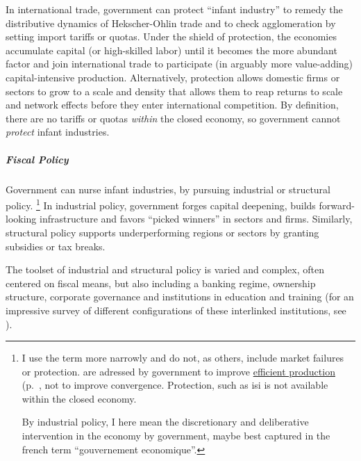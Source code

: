 In international trade, government can protect ``infant industry'' to remedy the distributive dynamics of Hekscher-Ohlin trade and to check agglomeration by setting import tariffs or quotas.
Under the shield of protection, the economies accumulate capital (or high-skilled labor) until it becomes the more abundant factor and join international trade to participate (in arguably more value-adding) capital-intensive production.
Alternatively, protection allows domestic firms or sectors to grow to a scale and density that allows them to reap returns to scale and network effects before they enter international competition.
By definition, there are no tariffs or quotas \emph{within} the closed economy, so government cannot \emph{protect} infant industries.

\subparagraph{Fiscal Policy}
Government can nurse infant industries, by pursuing industrial or structural policy.
\footnote{
	I use the term more narrowly and do not, as others, include market failures or protection.
	 are adressed by government to improve \hyperref[sec:production]{efficient production} (p.~\pageref{sec:production}, not to improve convergence.
	Protection, such as \gls{isi} is not available within the closed economy.

	By industrial policy, I here mean the discretionary and deliberative intervention in the economy by government, maybe best captured in the french term ``gouvernement economique''.
}
In industrial policy, government forges capital deepening, builds forward-looking infrastructure and favors ``picked winners'' in sectors and firms.
Similarly, structural policy supports underperforming regions or sectors by granting subsidies or tax breaks.

The toolset of industrial and structural policy is varied and complex, often centered on fiscal means, but also including a banking regime, ownership structure, corporate governance and institutions in education and training (for an impressive survey of different configurations of these interlinked institutions, see \citealt{HallSoskice-2001-aa}).

